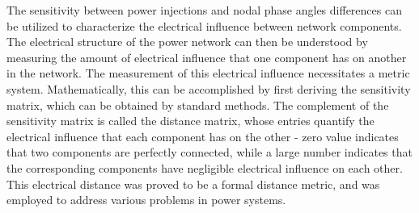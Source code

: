 \documentclass[10pt,journal,twocolumn]{IEEEtran}\IEEEoverridecommandlockouts
\begin{document}
The sensitivity between power injections and nodal phase angles differences can be utilized to characterize the electrical influence between network components. The electrical structure of the power network can then be understood by measuring the amount of electrical influence that one component has on another in the network. The measurement of this electrical influence necessitates a metric system. Mathematically, this can be accomplished by first deriving the sensitivity matrix, which can be obtained by standard methods. The complement of the sensitivity matrix is called the distance matrix, whose entries quantify the electrical influence that each component has on the other - zero value indicates that two components are perfectly connected, while a large number indicates that the corresponding components have negligible electrical influence on each other. This electrical distance was proved to be a formal distance metric, and was employed to address various problems in power systems.
\end{document}
